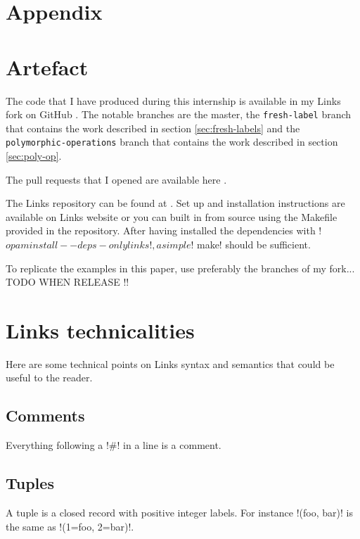 \documentclass[11pt, nonacm=true, language=french, language=english]{acmart}
\begin{document}
\newpage

\appendix

\section*{Appendix}

\section{Artefact}
\label{sec:code-production}

The code that I have produced during this internship is available in my Links fork on GitHub \cite{gh:mylinks}. The notable branches are the master, the \texttt{fresh-label} branch that contains the work described in section \ref{sec:fresh-labels} and the \texttt{polymorphic-operations} branch that contains the work described in section \ref{sec:poly-op}.

The pull requests that I opened are available here \cite{gh:prs}.

The Links repository can be found at \cite{gh:links}. Set up and installation instructions are available on Links website \cite{links-org} or you can built in from source using the Makefile provided in the repository. After having installed the dependencies with !$ opam install --deps-only links!, a simple !$ make! should be sufficient.

To replicate the examples in this paper, use preferably the branches of my fork... TODO WHEN RELEASE !!

\section{Links technicalities}
\label{sec:tech}

Here are some technical points on Links syntax and semantics that could be useful to the reader.

\subsection{Comments}
\label{sec:comments}
Everything following a !#! in a line is a comment.

\subsection{Tuples}
\label{sec:tuples}
A tuple is a closed record with positive integer labels. For instance !(foo, bar)! is the same as !(1=foo, 2=bar)!.
\end{document}
